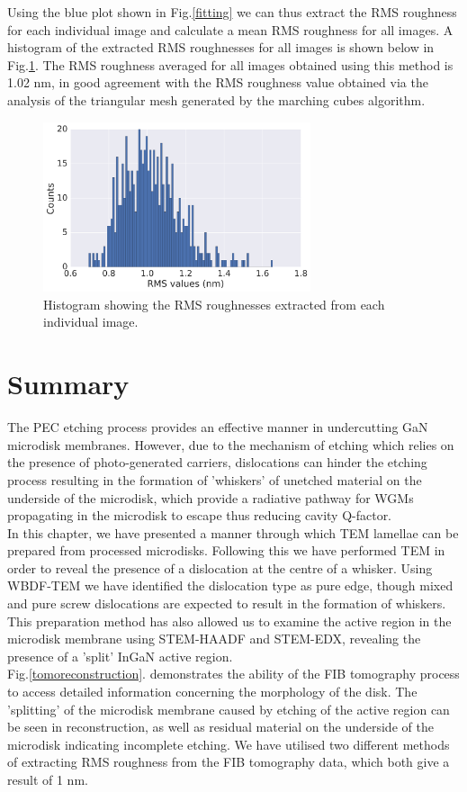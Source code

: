 Using the blue plot shown in Fig.\ref{fitting} we can thus extract the RMS roughness for each individual image and calculate a mean RMS roughness for all images. A histogram of the extracted RMS roughnesses for all images is shown below in Fig.\ref{RMSroughness}. The RMS roughness averaged for all images obtained using this method is 1.02 nm, in good agreement with the RMS roughness value obtained via the analysis of the triangular mesh generated by the marching cubes algorithm.

\begin{figure}[h]
	\centering
	\includegraphics[width=0.7\textwidth]{Figs/Ch4/RMScounts_nosmoothing_poly30.png}
	\caption {Histogram showing the RMS roughnesses extracted from each individual image.}
	\label{RMSroughness}
\end{figure}
\FloatBarrier

\section{Summary}
The PEC etching process provides an effective manner in undercutting GaN microdisk membranes. However, due to the mechanism of etching which relies on the presence of photo-generated carriers, dislocations can hinder the etching process resulting in the formation of 'whiskers' of unetched material on the underside of the microdisk, which provide a radiative pathway for WGMs propagating in the microdisk to escape thus reducing cavity Q-factor.\\
In this chapter, we have presented a manner through which TEM lamellae can be prepared from processed microdisks. Following this we have performed TEM in order to reveal the presence of a dislocation at the centre of a whisker. Using WBDF-TEM we have identified the dislocation type as pure edge, though mixed and pure screw dislocations are expected to result in the formation of whiskers. This preparation method has also allowed us to examine the active region in the microdisk membrane using STEM-HAADF and STEM-EDX, revealing the presence of a 'split' InGaN active region.\\
Fig.\ref{tomoreconstruction}. demonstrates the ability of the FIB tomography process to access detailed information concerning the morphology of the disk. The 'splitting' of the microdisk membrane caused by etching of the active region can be seen in reconstruction, as well as residual material on the underside of the microdisk indicating incomplete etching. We have utilised two different methods of extracting RMS roughness from the FIB tomography data, which both give a result of 1 nm.


